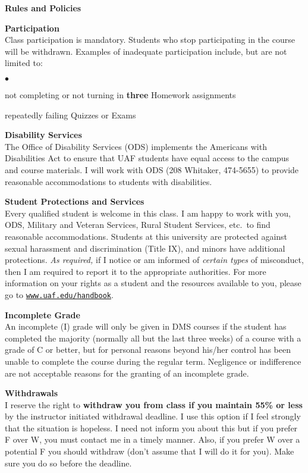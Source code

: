 \documentclass[12pt]{article}
\renewcommand{\emph}[1]{\textsf{\textbf{#1}}}
\newcommand{\localhead}[1]{\par\smallskip\textbf{#1}\nobreak\\}%
\def\heading#1{\localhead{\large\emph{#1}}}
\def\subheading#1{\localhead{\emph{#1}}}
\newenvironment{clist}%
{\bgroup\parskip 0pt\begin{list}{$\bullet$}{\partopsep 4pt\topsep 0pt\itemsep -2pt}}%
{\end{list}\egroup}%
\begin{document}
\bigskip
\heading{Rules and Policies}
\vskip -15pt
\subheading{Participation}
Class participation is mandatory.  Students who stop participating in the course will be withdrawn.  Examples of inadequate participation include, but are not limited to:

\begin{clist}
\item not completing or not turning in \textbf{three} Homework assignments
\item repeatedly failing Quizzes or Exams
\end{clist}

\subheading{Disability Services}
The Office of Disability Services (ODS) implements the Americans with Disabilities Act to ensure that UAF students have equal access to the campus and course materials.  I will work with ODS (208 Whitaker, 474-5655) to provide reasonable accommodations to students with disabilities.

\subheading{Student Protections and Services}
Every qualified student is welcome in this class.  I am happy to work with you, ODS, Military and Veteran Services, Rural Student Services, etc.~to find reasonable accommodations.  Students at this university are protected against sexual harassment and discrimination (Title IX), and minors have additional protections. \textit{As required,} if I notice or am informed of \textit{certain types} of misconduct, then I am required to report it to the appropriate authorities.  For more information on your rights as a student and the resources available to you, please go to \href{https://www.uaf.edu/handbook/}{\texttt{www.uaf.edu/handbook}}.


\subheading{Incomplete Grade} 
An incomplete (I) grade will only be given in DMS courses if the student has completed the majority (normally all but the last three weeks) of a course with a grade of C or better, but for personal reasons beyond his/her control has been unable to complete the course during the regular term. Negligence or indifference are not acceptable reasons for the granting of an incomplete grade. 

\subheading{Withdrawals}
I reserve the right to \textbf{withdraw you from class if you maintain 55\% or less} by the instructor initiated withdrawal deadline. I use this option if I feel strongly that the situation is hopeless. I need not inform you about this but if you prefer F over W, you must contact me in a timely manner. Also, if you prefer W over a potential F you should withdraw (don't assume that I will do it for you). Make sure you do so before the deadline.
\end{document}

